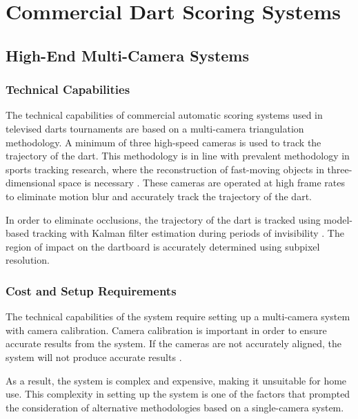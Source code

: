 \setauthor{\secondauthor}
\section{Commercial Dart Scoring Systems}

\subsection{High-End Multi-Camera Systems}

\subsubsection{Technical Capabilities}

The technical capabilities of commercial automatic scoring systems used in televised darts tournaments are based on a multi-camera triangulation methodology. A minimum of three high-speed cameras is used to track the trajectory of the dart. This methodology is in line with prevalent methodology in sports tracking research, where the reconstruction of fast-moving objects in three-dimensional space is necessary \cite{Osadchy2006}. These cameras are operated at high frame rates to eliminate motion blur and accurately track the trajectory of the dart.

In order to eliminate occlusions, the trajectory of the dart is tracked using model-based tracking with Kalman filter estimation during periods of invisibility \cite{Welch}. The region of impact on the dartboard is accurately determined using subpixel resolution.

\subsubsection{Cost and Setup Requirements}

The technical capabilities of the system require setting up a multi-camera system with camera calibration. Camera calibration is important in order to ensure accurate results from the system. If the cameras are not accurately aligned, the system will not produce accurate results \cite{Hartley2004}.

As a result, the system is complex and expensive, making it unsuitable for home use. This complexity in setting up the system is one of the factors that prompted the consideration of alternative methodologies based on a single-camera system.

